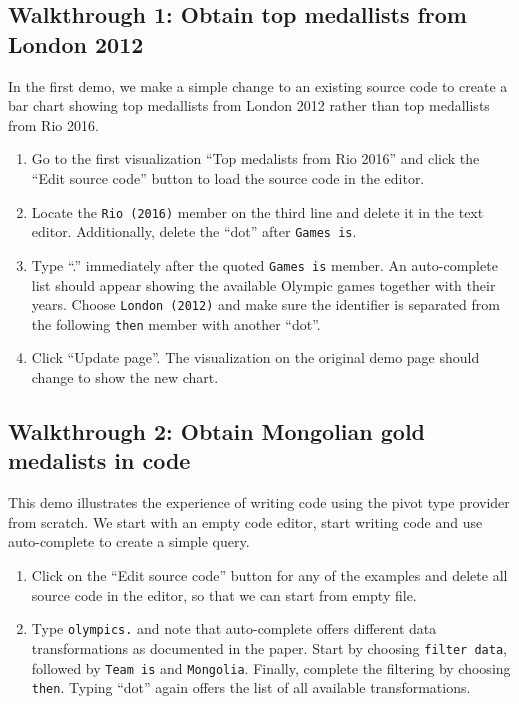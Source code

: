 \documentclass[a4paper,UKenglish]{darts}
\begin{document}
\begin{scope}
\subsection*{Walkthrough 1: Obtain top medallists from London 2012}

In the first demo, we make a simple change to an existing source code to create a bar chart
showing top medallists from London 2012 rather than top medallists from Rio 2016.

\begin{enumerate}
\item Go to the first visualization ``Top medalists from Rio 2016'' and click the ``Edit source code''
  button to load the source code in the editor.
\item Locate the \texttt{Rio (2016)} member on the third line and delete it in the text editor.
  Additionally, delete the ``dot'' after \texttt{Games is}.
\item Type ``.'' immediately after the quoted \texttt{Games is} member. An auto-complete list
  should appear showing the available Olympic games together with their years.
  Choose \texttt{London (2012)} and make sure the identifier is separated from the following
  \texttt{then} member with another ``dot''.
\item Click ``Update page''. The visualization on the original demo page should change to show
  the new chart.
\end{enumerate}

\subsection*{Walkthrough 2: Obtain Mongolian gold medalists in code} 

This demo illustrates the experience of writing code using the pivot type provider from scratch.
We start with an empty code editor, start writing code and use auto-complete to create a simple
query.

\begin{enumerate}
\item Click on the ``Edit source code'' button for any of the examples and delete all source code
  in the editor, so that we can start from empty file.
  
\item Type \texttt{olympics.} and note that auto-complete offers different data transformations 
  as documented in the paper. Start by choosing \texttt{filter data}, followed by 
  \texttt{Team is} and \texttt{Mongolia}. Finally, complete the filtering by choosing \texttt{then}.
  Typing ``dot'' again offers the list of all available transformations.


\end{enumerate}
\end{scope}
\end{document}
